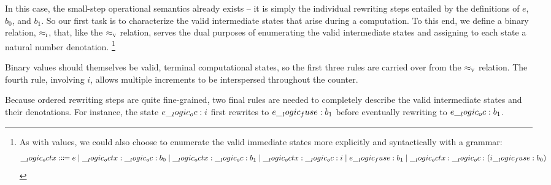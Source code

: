 In this case, the small-step operational semantics already exists -- it is simply the individual rewriting steps entailed by the definitions of $e$, $b_0$, and $b_1$.
So our first task is to characterize the valid intermediate states that arise during a computation.
To this end, we define a binary relation, $ \approx\sb{\text{\normalfont\scshape i}} $, that, like the $ \approx\sb{\text{\normalfont\scshape v}} $ relation, serves the dual purposes of enumerating the valid intermediate states and assigning to each state a natural number denotation.%
\footnote{As with values, we could also choose to enumerate the valid immediate states more explicitly and syntactically with a grammar:
  \begin{equation*}
    \__logic_octx: \Coloneqq e \mid \__logic_octx: \__logic_oc: b_0 \mid \__logic_octx: \__logic_oc: b_1 \mid \__logic_octx: \__logic_oc: i \mid e \__logic_fuse: b_1 \mid \__logic_octx: \__logic_oc: (i \__logic_fuse: b_0)
  \end{equation*}}
Binary values should themselves be valid, terminal computational states, so the first three rules are carried over from the $ \approx\sb{\text{\normalfont\scshape v}} $ relation.
The fourth rule, involving $i$, allows multiple increments to be interspersed throughout the counter.

Because ordered rewriting steps are quite fine-grained, two final rules are needed to completely describe the valid intermediate states and their denotations.
For instance, the state $e \__logic_oc: i$ first rewrites to $e \__logic_fuse: b_1$ before eventually rewriting to $e \__logic_oc: b_1$.



